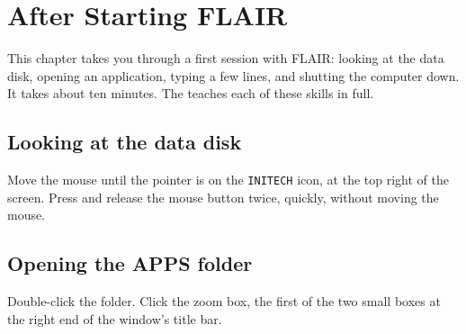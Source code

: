 \chapter{After Starting FLAIR}

This chapter takes you through a first session with FLAIR: looking at the
data disk, opening an application, typing a few lines, and shutting the
computer down.  It takes about ten minutes.  The  teaches each of these skills in full.

\section{Looking at the data disk}
\begin{TaskSteps}
\Step Move the mouse until the pointer is on the \texttt{INITECH} icon, at
the top right of the screen.
\Step Press and release the mouse button twice, quickly, without moving
the mouse.
\end{TaskSteps}


\section{Opening the APPS folder}
\begin{TaskSteps}
\Step Double-click the  folder.
\Step Click the zoom box, the first of the two small boxes at the right end
of the window's title bar.
\end{TaskSteps}

